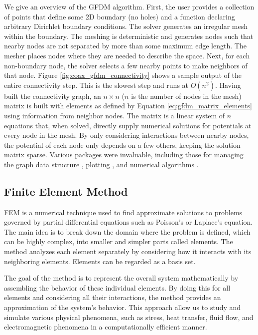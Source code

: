 \documentclass{PoS}
\begin{document}
We give an overview of the GFDM algorithm. First, the user provides a collection of points that define some 2D boundary (no holes) and a function declaring arbitrary Dirichlet boundary conditions. The solver generates an irregular mesh within the boundary. The meshing is deterministic and generates nodes such that nearby nodes are not separated by more than some maximum edge length. The mesher \cite{Schlomer_pygalmesh_Python_interface} places nodes where they are needed to describe the space. Next, for each non-boundary node, the solver selects a few nearby points to make neighbors of that node. Figure \ref{fig:coax_gfdm_connectivity} shows a sample output of the entire connectivity step. This is the slowest step and runs at $O(n^2)$. Having built the connectivity graph, an $n \times n$ ($n$ is the number of nodes in the mesh) matrix is built with elements as defined by Equation \ref{eq:gfdm_matrix_elements} using information from neighbor nodes. The matrix is a linear system of $n$ equations that, when solved, directly supply numerical solutions for potentials at every node in the mesh. By only considering interactions between nearby nodes, the potential of each node only depends on a few others, keeping the solution matrix sparse. Various packages were invaluable, including those for managing the graph data structure \cite{networkx}, plotting \cite{matplotlib}, and numerical algorithms \cite{numpy}.

\subsection{Finite Element Method}

FEM is a numerical technique used to find approximate solutions to problems governed by partial differential equations such as Poisson's or Laplace's equation. The main idea is to break down the domain where the problem is defined, which can be highly complex, into smaller and simpler parts called elements. The method analyzes each element separately by considering how it interacts with its neighboring elements. Elements can be regarded as a basis set.

The goal of the method is to represent the overall system mathematically by assembling the behavior of these individual elements. By doing this for all elements and considering all their interactions, the method provides an approximation of the system's behavior. This approach allow us to study and simulate various physical phenomena, such as stress, heat transfer, fluid flow, and electromagnetic phenomena in a computationally efficient manner.
\end{document}
